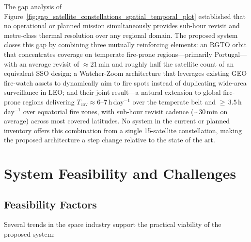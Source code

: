 The gap analysis of Figure~\ref{fig:gap_satellite_constellations_spatial_temporal_plot} established that no operational or planned mission simultaneously provides sub-hour revisit and metre-class thermal resolution over any regional domain.  The proposed system closes this gap by combining three mutually reinforcing elements: an RGTO orbit that concentrates coverage on temperate fire-prone regions---primarily Portugal---with an average revisit of $\approx 21$\,min and roughly half the satellite count of an equivalent SSO design; a Watcher-Zoom architecture that leverages existing GEO fire-watch assets to dynamically aim to fire spots instead of duplicating wide-area surveillance in LEO; and their joint result---a natural extension to global fire-prone regions delivering $T_{\text{cov}} \approx 6$--$7$\,h\,day$^{-1}$ over the temperate belt and ${\geq}\,3.5$\,h\,day$^{-1}$ over equatorial fire zones, with sub-hour revisit cadence ($\sim\!30$\,min on average) across most covered latitudes.  No system in the current or planned inventory offers this combination from a single 15-satellite constellation, making the proposed architecture a step change relative to the state of the art.

\section{System Feasibility and Challenges}\label{sec:discussion-feasibility}

\subsection{Feasibility Factors}

Several trends in the space industry support the practical viability of the proposed system:


